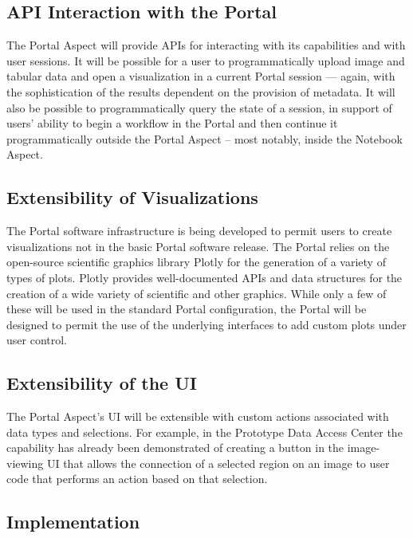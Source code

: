 \subsection{API Interaction with the Portal}\label{api-interaction-portal}

The Portal Aspect will provide APIs for interacting with its capabilities and with user sessions.
It will be possible for a user to programmatically upload image and tabular data and open a visualization in a current Portal session --- again, with the sophistication of the results dependent on the provision of metadata.
It will also be possible to programmatically query the state of a session, in support of users' ability to begin a workflow in the Portal and then continue it programmatically outside the Portal Aspect -- most notably, inside the Notebook Aspect.

\subsection{Extensibility of Visualizations}\label{extensibility-of-visualizations}

The Portal software infrastructure is being developed to permit users to create visualizations not in the basic Portal software release.
The Portal relies on the open-source scientific graphics library Plotly for the generation of a variety of types of plots.
Plotly provides well-documented APIs and data structures for the creation of a wide variety of scientific and other graphics.
While only a few of these will be used in the standard Portal configuration, the Portal will be designed to permit the use of the underlying interfaces to add custom plots under user control.

\subsection{Extensibility of the UI}\label{extensibility-of-the-ui}

The Portal Aspect's UI will be extensible with custom actions associated with data types and selections.
For example, in the Prototype Data Access Center the capability has already been demonstrated of creating a button in the image-viewing UI that allows the connection of a selected region on an image to user code that performs an action based on that selection.

\subsection{Implementation}

